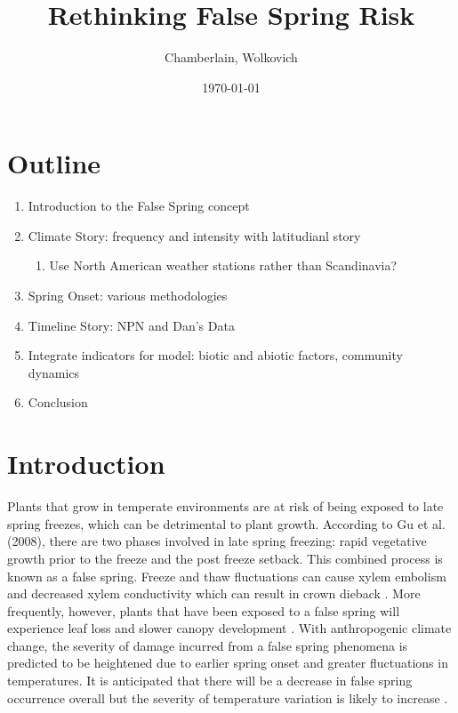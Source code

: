 \documentclass{article}\usepackage[]{graphicx}\usepackage[]{color}
\begin{document}
\title{Rethinking False Spring Risk}
\author{Chamberlain, Wolkovich}
\date{\today}
\maketitle 

\renewcommand{\thetable}{\arabic{table}}
\renewcommand{\thefigure}{\arabic{figure}}
\renewcommand{\labelitemi}{$-$}

\section*{Outline}
\begin{enumerate}
  \item Introduction to the False Spring concept
  \item Climate Story: frequency and intensity with latitudianl story
  \begin{enumerate}
    \item Use North American weather stations rather than Scandinavia?
  \end{enumerate}
  \item Spring Onset: various methodologies
  \item Timeline Story: NPN and Dan's Data
  \item Integrate indicators for model: biotic and abiotic factors, community dynamics
  \item Conclusion
\end{enumerate}

\section*{Introduction}
Plants that grow in temperate environments are at risk of being exposed to late spring freezes, which can be detrimental to plant growth. According to Gu et al. (2008), there are two phases involved in late spring freezing: rapid vegetative growth prior to the freeze and the post freeze setback. This combined process is known as a false spring. Freeze and thaw fluctuations can cause xylem embolism and decreased xylem conductivity which can result in crown dieback \citep{Gu2008}.
More frequently, however, plants that have been exposed to a false spring will experience leaf loss and slower canopy development \citep{Hufkens2012}. 
With anthropogenic climate change, the severity of damage incurred from a false spring phenomena is predicted to be heightened due to earlier spring onset and greater fluctuations in temperatures. It is anticipated that there will be a decrease in false spring occurrence overall but the severity of temperature variation is likely to increase \citep{Allstadt2015}. 
\end{document}
